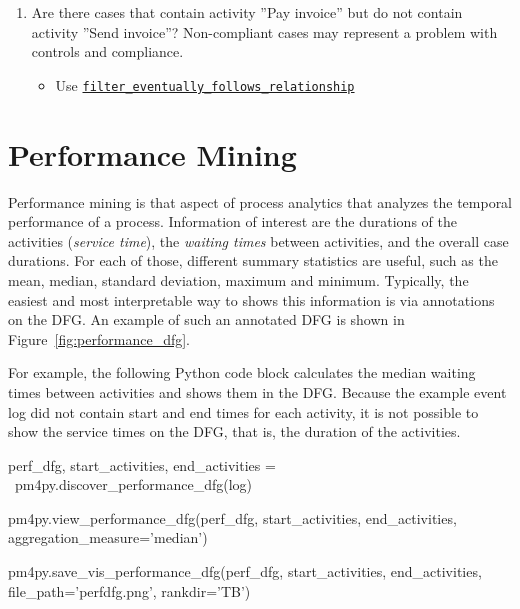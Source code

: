 \begin{withcode}
\begin{exerciseboxcomputer}
\begin{enumerate}
   \item Are there cases that contain activity ''Pay invoice'' but do not contain activity ''Send invoice''? Non-compliant cases may represent a problem with controls and compliance.
   \begin{itemize}
      \item Use \href{https://processintelligence.solutions/static/api/2.7.11/generated/pm4py.filtering.filter_eventually_follows_relation.html}{\texttt{filter\_eventually\_follows\_relationship}}
   \end{itemize}
\end{enumerate}
\end{exerciseboxcomputer}
\end{withcode}

\section{Performance Mining}

Performance mining is that aspect of process analytics that analyzes the temporal performance of a process. Information of interest are the durations of the activities (\emph{service time}), the \emph{waiting times} between activities, and the overall case durations. For each of those, different summary statistics are useful, such as the mean, median, standard deviation, maximum and minimum. Typically, the easiest and most interpretable way to shows this information is via annotations on the DFG. An example of such an annotated DFG is shown in Figure~\ref{fig:performance_dfg}. 

\begin{withcode}
For example, the following Python code block calculates the median waiting times between activities and shows them in the DFG. Because the example event log did not contain start and end times for each activity, it is not possible to show the service times on the DFG, that is, the duration of the activities.

\begin{pythoncode}
perf_dfg, start_activities, end_activities = \
    pm4py.discover_performance_dfg(log)
    
pm4py.view_performance_dfg(perf_dfg, 
    start_activities, end_activities, 
    aggregation_measure='median')

pm4py.save_vis_performance_dfg(perf_dfg, 
    start_activities, end_activities, 
    file_path='perfdfg.png', rankdir='TB')
\end{pythoncode}
\end{withcode}

